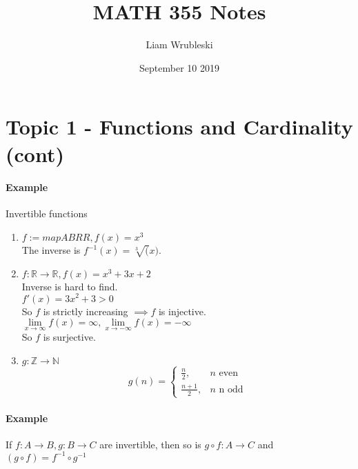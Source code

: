 \documentclass{article}
\title{MATH 355 Notes}
\author{Liam Wrubleski}
\date{September 10 2019}
\newcommand{\mapab}[2]{{#1}\xrightarrow{}{#2}}
\newcommand{\mapAB}[2]{\mathbb{#1}\xrightarrow{}\mathbb{#2}}
\begin{document}
	\maketitle
	\section{Topic 1 - Functions and Cardinality (cont)}
	\paragraph{Example} Invertible functions\newline
	\begin{enumerate}[label=(\roman*)]
		\item $f:=mapAB{R}{R}, f(x) = x^3$\\
		The inverse is $f^{-1}(x) = \sqrt[3](x)$.\\
		\item $f:\mapAB{R}{R}, f(x) = x^3+3x+2$\\
		Inverse is hard to find.\\
		$f'(x) = 3x^2+3>0$\\
		So $f$ is strictly increasing $\implies f$ is injective.\\
		$\lim\limits_{x\to\infty}f(x)=\infty, \lim\limits_{x\to-\infty}f(x)=-\infty$\\
		So $f$ is surjective.\\
		\item $g:\mapAB{Z}{N}$\\
		\begin{equation*}
		g(n) = \begin{cases}\frac{n}{2}, & n\textrm{ even}\\\frac{n+1}{2}, & n\textrm{ n odd}
		\end{cases}
		\end{equation*}
	\end{enumerate}
	\paragraph{Example}
	If $f:\mapab{A}{B}, g:\mapab{B}{C}$ are invertible, then so is $g\circ f:\mapab{A}{C}$ and $(g\circ f) = f^{-1}\circ g^{-1}$
\end{document}
